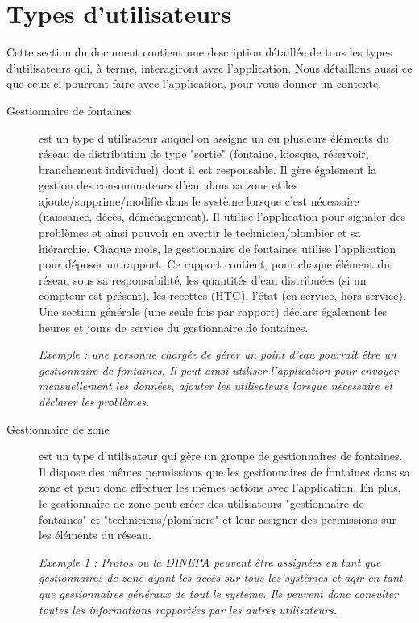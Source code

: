 \documentclass[a4paper, 11pt]{article}
\begin{document}
\section{Types d'utilisateurs}
\label{users}
Cette section du document contient une description détaillée de tous les types d'utilisateurs qui, à terme, interagiront avec l'application. Nous détaillons aussi ce que ceux-ci pourront faire avec l'application, pour vous donner un contexte.

  \begin{description}
    \item[Gestionnaire de fontaines] est un type d'utilisateur auquel on assigne un ou plusieurs éléments du réseau de distribution de type "sortie" (fontaine, kiosque, réservoir, branchement individuel) dont il est responsable.
    Il gère également la gestion des consommateurs d'eau dans sa zone et les ajoute/supprime/modifie dans le système lorsque c'est nécessaire (naissance, décès, déménagement).
    Il utilise l'application pour signaler des problèmes et ainsi pouvoir en avertir le technicien/plombier et sa hiérarchie. Chaque mois, le gestionnaire de fontaines utilise l'application pour déposer un rapport. Ce rapport contient, pour chaque élément du réseau sous sa responsabilité, les quantités d'eau distribuées (si un compteur est présent), les recettes (HTG), l'état (en service, hors service). Une section générale (une seule fois par rapport) déclare également les heures et jours de service du gestionnaire de fontaines.

    \emph{Exemple : une personne chargée de gérer un point d'eau pourrait être un gestionnaire de fontaines. Il peut ainsi utiliser l'application pour envoyer mensuellement les données, ajouter les utilisateurs lorsque nécessaire et déclarer les problèmes.}

    \item[Gestionnaire de zone] est un type d'utilisateur qui gère un groupe de gestionnaires de fontaines. Il dispose des mêmes permissions que les gestionnaires de fontaines dans sa zone et peut donc effectuer les mêmes actions avec l'application. En plus, le gestionnaire de zone peut créer des utilisateurs "gestionnaire de fontaines" et  "techniciens/plombiers" et leur assigner des permissions sur les éléments du réseau. %

    \emph{Exemple 1 : Protos ou la DINEPA peuvent être assignées en tant que gestionnaires de zone ayant les accès sur tous les systèmes et agir en tant que gestionnaires généraux de tout le système. Ils peuvent donc consulter toutes les informations rapportées par les autres utilisateurs.}


\end{description}
\end{document}
